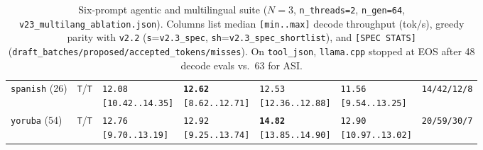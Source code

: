 \documentclass[11pt,a4paper]{article}
\begin{document}
\begin{table}[h]
\begin{tabular}{@{}lclllll@{}}
\texttt{spanish} (26) & \texttt{T}/\texttt{T} & \shortstack[l]{\texttt{12.08}\\\scriptsize\texttt{[10.42..14.35]}} & \shortstack[l]{\textbf{\texttt{12.62}}\\\scriptsize\texttt{[8.62..12.71]}} & \shortstack[l]{\texttt{12.53}\\\scriptsize\texttt{[12.36..12.88]}} & \shortstack[l]{\texttt{11.56}\\\scriptsize\texttt{[9.54..13.25]}} & \texttt{14/42/12/8} \\
\texttt{yoruba} (54) & \texttt{T}/\texttt{T} & \shortstack[l]{\texttt{12.76}\\\scriptsize\texttt{[9.70..13.19]}} & \shortstack[l]{\texttt{12.92}\\\scriptsize\texttt{[9.25..13.74]}} & \shortstack[l]{\textbf{\texttt{14.82}}\\\scriptsize\texttt{[13.85..14.90]}} & \shortstack[l]{\texttt{12.90}\\\scriptsize\texttt{[10.97..13.02]}} & \texttt{20/59/30/7} \\
\bottomrule
\end{tabular}
\caption{Six-prompt agentic and multilingual suite ($N=3$, \texttt{n\_threads=2}, \texttt{n\_gen=64}, \texttt{v23\_multilang\_ablation.json}). Columns list median \texttt{[min..max]} decode throughput (tok/s), greedy parity with \texttt{v2.2} (\texttt{s}=\texttt{v2.3\_spec}, \texttt{sh}=\texttt{v2.3\_spec\_shortlist}), and \texttt{[SPEC STATS]} (\texttt{draft\_batches/proposed/accepted\_tokens/misses}). On \texttt{tool\_json}, \texttt{llama.cpp} stopped at EOS after 48 decode evals vs.\ 63 for ASI.}
\label{tab:v23_multilang}
\end{table}
\end{document}
